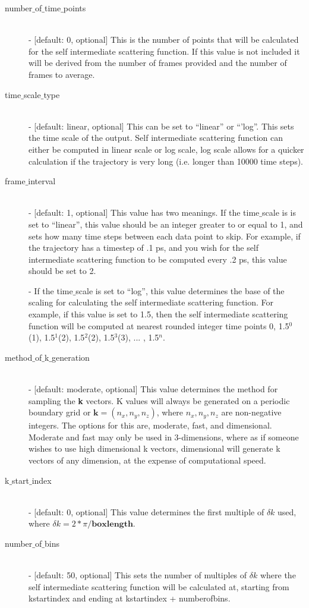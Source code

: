 \documentclass{article}
\begin{document}
\begin{description}	
	\item[number$\_$of$\_$time$\_$points]\hfill \\
	- [default: 0, optional] This is the number of points that will be calculated for the self intermediate scattering function.  If this value is not included it will be derived from the number of frames provided and the number of frames to average.
	
	\item[time$\_$scale$\_$type] \hfill \\
	- [default: linear, optional] This can be set to ``linear'' or ``'log''.  This sets the time scale of the output. Self intermediate scattering function can either be computed in linear scale or log scale, log scale allows for a quicker calculation if the trajectory is very long (i.e. longer than 10000 time steps).
	
	\item[frame$\_$interval] \hfill \\
	- [default: 1, optional] This value has two meanings.  If the time$\_$scale is is set to ``linear'', this value should be an integer greater to or equal to 1, and sets how many time steps between each data point to skip.  For example, if the trajectory has a timestep of .1 ps, and you wish for the self intermediate scattering function to be computed every .2 ps, this value should be set to 2. 
	
	- If the time$\_$scale is set to ``log'', this value determines the base of the scaling for calculating the self intermediate scattering function.  For example, if this value is set to 1.5, then the self intermediate scattering function will be computed at nearest rounded integer time points 0, 1.5$^0$(1), 1.5$^1$(2), 1.5$^2$(2), 1.5$^3$(3), ... , 1.5$^{n}$.
	
	\item[method$\_$of$\_$k$\_$generation] \hfill \\
	- [default: moderate, optional] This value determines the method for sampling the \textbf{k} vectors.  K values will always be generated on a periodic boundary grid or $\mathbf{k} = (n_x,n_y,n_z)$, where $n_x, n_y, n_z$ are non-negative integers.  The options for this are, moderate, fast, and dimensional.  Moderate and fast may only be used in 3-dimensions, where as if someone wishes to use high dimensional k vectors, dimensional will generate k vectors of any dimension, at the expense of computational speed.
	
	\item[k$\_$start$\_$index] \hfill \\
	- [default: 0, optional] This value determines the first multiple of $\delta k$ used, where $\delta k = 2*\pi/\textbf{boxlength}$.  
	
	\item[number$\_$of$\_$bins] \hfill \\
	- [default: 50, optional] This sets the number of multiples of $\delta k$ where the self intermediate scattering function will be calculated at, starting from kstartindex and ending at kstartindex + numberofbins. 	
	
\end{description}
\end{document}
